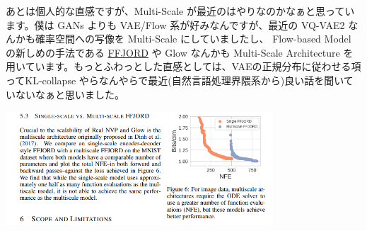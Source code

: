 \documentclass[a4paper, dvipdfmx, 10pt]{article}
\begin{document}
あとは個人的な直感ですが、Multi-Scale が最近のはやりなのかなぁと思っています。僕は GANs よりも VAE/Flow 系が好みなんですが、最近の VQ-VAE2 なんかも確率空間への写像を Multi-Scale にしていましたし、 Flow-based Model の新しめの手法である \href{https://arxiv.org/pdf/1810.01367.pdf}{FFJORD} や Glow なんかも Multi-Scale Architecture を用いています。もっとふわっとした直感としては、VAEの正規分布に従わせる項ってKL-collapse やらなんやらで最近(自然言語処理界隈系から)良い話を聞いていないなぁと思いました。\\

\begin{center}
\includegraphics[width=10cm]{./multi-scale.png}
\end{center}
\end{document}
